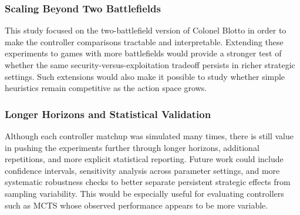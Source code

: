 \documentclass[letterpaper, 10 pt, conference]{ieeeconf}  %
\begin{document}
\subsubsection{Scaling Beyond Two Battlefields}
This study focused on the two-battlefield version of Colonel Blotto in order to make the controller comparisons tractable and interpretable. Extending these experiments to games with more battlefields would provide a stronger test of whether the same security-versus-exploitation tradeoff persists in richer strategic settings. Such extensions would also make it possible to study whether simple heuristics remain competitive as the action space grows.

\subsubsection{Longer Horizons and Statistical Validation}
Although each controller matchup was simulated many times, there is still value in pushing the experiments further through longer horizons, additional repetitions, and more explicit statistical reporting. Future work could include confidence intervals, sensitivity analysis across parameter settings, and more systematic robustness checks to better separate persistent strategic effects from sampling variability. This would be especially useful for evaluating controllers such as MCTS whose observed performance appears to be more variable.

\end{document}
